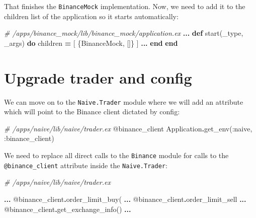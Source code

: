 \documentclass[
  oneside]{book}
\newenvironment{Shaded}{\begin{snugshade}}{\end{snugshade}}
\newcommand{\CommentTok}[1]{\textcolor[rgb]{0.56,0.35,0.01}{\textit{#1}}}
\newcommand{\ConstantTok}[1]{\textcolor[rgb]{0.00,0.00,0.00}{#1}}
\newcommand{\KeywordTok}[1]{\textcolor[rgb]{0.13,0.29,0.53}{\textbf{#1}}}
\newcommand{\NormalTok}[1]{#1}
\newcommand{\OperatorTok}[1]{\textcolor[rgb]{0.81,0.36,0.00}{\textbf{#1}}}
\newcommand{\OtherTok}[1]{\textcolor[rgb]{0.56,0.35,0.01}{#1}}
\newcommand{\VariableTok}[1]{\textcolor[rgb]{0.00,0.00,0.00}{#1}}
\begin{document}
That finishes the \texttt{BinanceMock} implementation. Now, we need to add it to
the children list of the application so it starts automatically:

\begin{Shaded}
\begin{Highlighting}[]
\CommentTok{\# /apps/binance\_mock/lib/binance\_mock/application.ex}
\OperatorTok{...}
  \KeywordTok{def}\NormalTok{ start(\_type, \_args) }\KeywordTok{do}
\NormalTok{    children }\OperatorTok{=}\NormalTok{ [}
\NormalTok{      \{}\ConstantTok{BinanceMock}\NormalTok{, []\}}
\NormalTok{    ]}
    \OperatorTok{...}
  \KeywordTok{end}
\KeywordTok{end}
\end{Highlighting}
\end{Shaded}

\hypertarget{upgrade-trader-and-config}{%
\section{Upgrade trader and config}\label{upgrade-trader-and-config}}

We can move on to the \texttt{Naive.Trader} module where we will add an attribute which will point to the Binance client dictated by config:

\begin{Shaded}
\begin{Highlighting}[]
  \CommentTok{\# /apps/naive/lib/naive/trader.ex}
  \OtherTok{@binance\_client} \ConstantTok{Application}\OperatorTok{.}\NormalTok{get\_env(}\VariableTok{:naive}\NormalTok{, }\VariableTok{:binance\_client}\NormalTok{)}
\end{Highlighting}
\end{Shaded}

We need to replace all direct calls to the \texttt{Binance} module for calls to the \texttt{@binance\_client} attribute inside the \texttt{Naive.Trader}:

\begin{Shaded}
\begin{Highlighting}[]
\CommentTok{\# /apps/naive/lib/naive/trader.ex}

\OperatorTok{...}
  \OtherTok{@binance\_client}\OperatorTok{.}\NormalTok{order\_limit\_buy(}
\OperatorTok{...}
  \OtherTok{@binance\_client}\OperatorTok{.}\NormalTok{order\_limit\_sell}
\OperatorTok{...}
  \OtherTok{@binance\_client}\OperatorTok{.}\NormalTok{get\_exchange\_info()}
\OperatorTok{...}
\end{Highlighting}
\end{Shaded}
\end{document}
